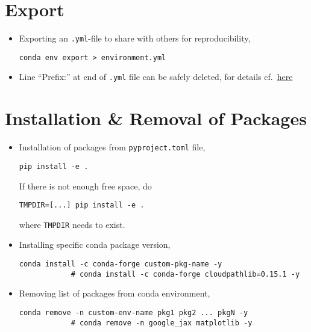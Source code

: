\documentclass[12pt, a4paper]{scrbook}
\numberwithin{equation}{section}
\theoremstyle{definition}
\theoremstyle{definition}
\begin{document}
	\section{Export}
	
	\begin{itemize}
		\item Exporting an \texttt{.yml}-file to share with others for reproducibility,
		
		\begin{lstlisting}[style=mystylebash, label=alg:conda_export, xleftmargin=\parindent]
			conda env export > environment.yml
		\end{lstlisting}
		
		\item Line \enquote{Prefix:} at end of \texttt{.yml} file can be safely deleted, for details cf.~\href{https://stackoverflow.com/questions/39280638/how-to-share-conda-environments-across-platforms}{here}
	\end{itemize}
	
	\section{Installation \& Removal of Packages}
	
	\begin{itemize} 
	
		\item Installation of packages from \texttt{pyproject.toml} file, 
		
		\begin{lstlisting}[style=mystylebash, label=alg:pyproject_install, xleftmargin=\parindent]
			pip install -e .
		\end{lstlisting}
	
		If there is not enough free space, do
		
		\begin{lstlisting}[style=mystylebash, xleftmargin=\parindent]
			 TMPDIR=[...] pip install -e .
		\end{lstlisting}
		
		where \texttt{TMPDIR} needs to exist.
	
		\item Installing specific conda package version,
		
		\begin{lstlisting}[style=mystylebash, label=alg:conda__spec_env_version, xleftmargin=\parindent]
			conda install -c conda-forge custom-pkg-name -y
			# conda install -c conda-forge cloudpathlib=0.15.1 -y
		\end{lstlisting}
	
		\item Removing list of packages from conda environment,
		
		\begin{lstlisting}[style=mystylebash, label=alg:conda__remove_pkgs, xleftmargin=\parindent]
			conda remove -n custom-env-name pkg1 pkg2 ... pkgN -y
			# conda remove -n google_jax matplotlib -y
		\end{lstlisting}
		
	\end{itemize}
\end{document}
